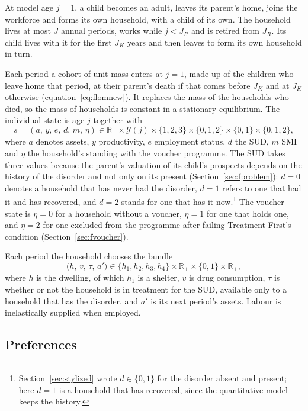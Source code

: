 \documentclass[10pt]{article}
\begin{document}
At model age $j=1$, a child becomes an adult, leaves its parent's home, joins the workforce and forms its own household, with a child of its own. The household lives at most $J$ annual periods, works while $j<J_R$ and is retired from $J_R$. Its child lives with it for the first $J_K$ years and then leaves to form its own household in turn.

Each period a cohort of unit mass enters at $j=1$, made up of
the children who leave home that period, at their parent's death if that comes before $J_K$ and at $J_K$
otherwise (equation~\eqref{eq:flomnew}). It replaces the mass of the households who died, so the mass of households is constant in a stationary equilibrium. The individual state is age $j$ together with
\begin{equation}\label{eq:fstate}
s=(a,\,y,\,e,\,d,\,m,\,\eta)\in
\mathbb R_+\times\mathcal Y(j)\times\{1,2,3\}\times\{0,1,2\}\times\{0,1\}\times\{0,1,2\},
\end{equation}
where $a$ denotes assets, $y$ productivity, $e$ employment status, $d$ the SUD, $m$
SMI and $\eta$ the household's standing with the voucher programme. The SUD takes
three values because the parent's valuation of its child's prospects depends on the history of the disorder and not only on its present (Section~\ref{sec:fproblem}): $d=0$ denotes a household that has never had the disorder, $d=1$ refers to
one that had it and has recovered, and $d=2$ stands for one that has it now.\footnote{Section~\ref{sec:stylized} wrote $d\in\{0,1\}$ for the disorder absent and present; here $d=1$ is a household that has recovered, since the quantitative model keeps the history.} The
voucher state is $\eta=0$ for a household without a voucher, $\eta=1$ for one that holds one, and $\eta=2$ for one excluded from the programme after failing
Treatment First's condition (Section~\ref{sec:fvoucher}).

Each period the household chooses the bundle
\begin{equation}\label{eq:fchoice}
\big(h,\,v,\,\tau,\,a'\big)\in
\{h_1,h_2,h_3,h_4\}\times\mathbb R_+\times\{0,1\}\times\mathbb R_+ ,
\end{equation}
where $h$ is the dwelling, of which $h_1$ is a shelter, $v$ is drug consumption, $\tau$ is whether or not the household is in treatment for the SUD, available only to a household that has
the disorder, and $a'$ is its next period's assets. Labour is inelastically supplied when employed.

\subsection{Preferences}\label{sec:fprefs}
\end{document}
